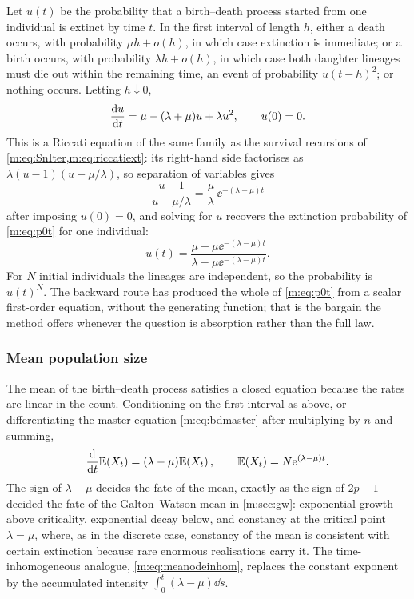 Let $u(t)$ be the probability that a birth--death process started from one
individual is extinct by time $t$. In the first interval of length $h$, either
a death occurs, with probability $\mu h+o(h)$, in which case extinction is
immediate; or a birth occurs, with probability $\lambda h+o(h)$, in which case
both daughter lineages must die out within the remaining time, an event of
probability $u(t-h)^2$; or nothing occurs. Letting $h\downarrow0$,
\begin{equation}
\label{m:eq:bdbackward}
\frac{\mathrm{d} u}{\mathrm{d} t} = \mu - (\lambda+\mu)u + \lambda u^2,
\qquad u(0) = 0 .
\end{equation}
This is a Riccati equation of the same family as the survival recursions of
\cref{m:eq:SnIter,m:eq:riccatiext}: its right-hand side factorises as
$\lambda(u-1)(u-\mu/\lambda)$, so separation of variables gives
\begin{equation*}
\frac{u-1}{u-\mu/\lambda} = \frac{\mu}{\lambda}\,\ee^{-(\lambda-\mu)t}
\end{equation*}
after imposing $u(0)=0$, and solving for $u$ recovers the extinction
probability of \cref{m:eq:p0t} for one individual:
\begin{equation}
\label{m:eq:u1}
u(t) = \frac{\mu-\mu\ee^{-(\lambda-\mu)t}}{\lambda-\mu\ee^{-(\lambda-\mu)t}} .
\end{equation}
For $N$ initial individuals the lineages are independent, so the probability is
$u(t)^N$. The backward route has produced the whole of \cref{m:eq:p0t} from a
scalar first-order equation, without the generating function; that is the
bargain the method offers whenever the question is absorption rather than the
full law.

\subsubsection{Mean population size}
\label{m:sec:ctmean}

The mean of the birth--death process satisfies a closed equation because the
rates are linear in the count. Conditioning on the first interval as above, or
differentiating the master equation \cref{m:eq:bdmaster} after multiplying by
$n$ and summing,
\begin{equation}
\label{m:eq:bdmeanode}
\frac{\mathrm{d} }{\mathrm{d} t}\mathbb{E}\!\left(X_t\right) = (\lambda-\mu)\mathbb{E}\!\left(X_t\right),
\qquad
\mathbb{E}\!\left(X_t\right) = N\mathrm{e}^{(\lambda-\mu)t} .
\end{equation}
The sign of $\lambda-\mu$ decides the fate of the mean, exactly as the sign of
$2p-1$ decided the fate of the Galton--Watson mean in \cref{m:sec:gw}:
exponential growth above criticality, exponential decay below, and constancy at
the critical point $\lambda=\mu$, where, as in the discrete case, constancy of
the mean is consistent with certain extinction because rare enormous
realisations carry it. The time-inhomogeneous analogue,
\cref{m:eq:meanodeinhom}, replaces the constant exponent by the accumulated
intensity $\int_0^t(\lambda-\mu)\dd s$.

